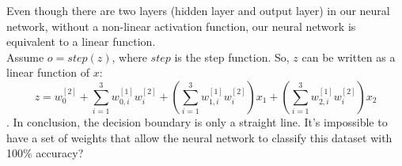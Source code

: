 \begin{answer}
Even though there are two layers (hidden layer and output layer) in our neural network, without a non-linear activation function, our neural network is equivalent to a linear function.\\
Assume $o = step(z)$, where $step$ is the step function. So, $z$ can be written as a linear function of $x$: $$z = w^{[2]}_0+\sum\limits_{i=1}^3 w^{[1]}_{0,i} w^{[2]}_{i} + (\sum\limits_{i=1}^3 w^{[1]}_{1, i} w^{[2]}_{i}) x_1 + (\sum\limits_{i=1}^3 w^{[1]}_{2, i} w^{[2]}_{i}) x_2$$. In conclusion, the decision boundary is only a straight line. It's impossible to have a set of weights that allow the neural network to classify this dataset with 100\% accuracy?
\end{answer}
